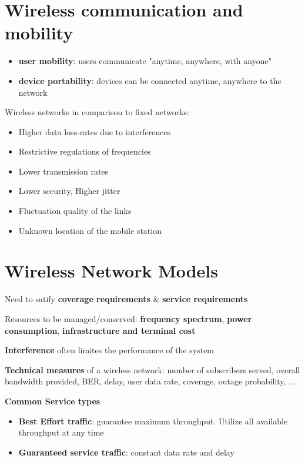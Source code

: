 
\section{Wireless communication and mobility}

\begin{notImportant}
	\begin{itemize}
		\item \textbf{user mobility}: users communicate "anytime, anywhere, with anyone"
		\item \textbf{device portability}: devices can be connected anytime, anywhere to the network
	\end{itemize}
\end{notImportant}

Wireless networks in comparison to fixed networks:

\begin{itemize}
	\item Higher data loss-rates due to interferences
	\item Restrictive regulations of frequencies
	\item Lower transmission rates
	\item Lower security, Higher jitter
	\item Fluctuation quality of the links
	\item Unknown location of the mobile station
\end{itemize}


\section{Wireless Network Models}
Need to satify \textbf{coverage requirements} \& \textbf{service requirements}

Resources to be managed/conserved: \textbf{frequency spectrum}, \textbf{power consumption}, \textbf{infrastructure and terminal cost}

\textbf{Interference} often limites the performance of the system

\textbf{Technical measures} of a wireless network: number of subscribers served, overall bandwidth provided, BER, delay, user data rate, coverage, outage probability, ...

\textbf{Common Service types}
\begin{itemize}
	\item \textbf{Best Effort traffic}: guarantee maximum throughput. Utilize all available throughput at any time
    \item \textbf{Guaranteed service traffic}: constant data rate and delay
\end{itemize}

